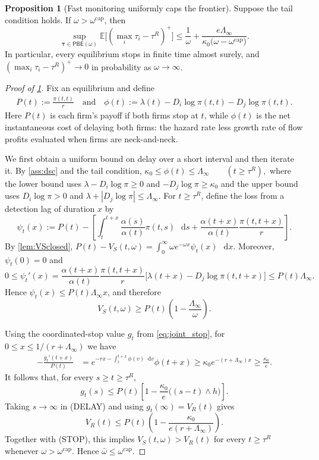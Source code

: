 \documentclass[12pt,reqno]{article}
\newcommand{\de}{\mathop{}\!\mathrm{d}}
\newcommand{\Ex}{\mathbb{E}}
\newcommand{\PBE}{\ensuremath{\mathsf{PBE}}}
\theoremstyle{definition} \newtheorem{example}{Example}
\theoremstyle{definition} \newtheorem{condition}{Condition}
\theoremstyle{definition} \newtheorem{corollary}{Corollary}
\theoremstyle{definition} \newtheorem{claim}{Claim}
\theoremstyle{definition} \newtheorem{definition}{Definition}
\theoremstyle{definition} \newtheorem{conjecture}{Conjecture}
\theoremstyle{definition} \newtheorem{Lemma}{Lemma}
\theoremstyle{definition} \newtheorem{lemma}{Lemma}
\theoremstyle{plain} \newtheorem{theorem}{Theorem}
\theoremstyle{definition} \newtheorem{assumption}{Assumption}
\theoremstyle{definition} \newtheorem*{assumptionnonumber}{Assumption}
\theoremstyle{definition} \newtheorem*{theoremNoNumber}{Proposition}
\theoremstyle{definition}
\theoremstyle{definition}\newtheorem{proposition}{Proposition}
\theoremstyle{definition} \newtheorem{result}{Result}
\theoremstyle{definition} \newtheorem*{definitionNoNumber}{Definition}
\theoremstyle{definition} \newtheorem{Definition}{Definition}
\theoremstyle{definition} \newtheorem*{DefinitionNoNumber}{Definition}
\theoremstyle{definition} \newtheorem*{fact}{Fact}
\theoremstyle{definition} \newtheorem*{property}{Property}
\theoremstyle{definition} \newtheorem{remark}{Remark}
\begin{document}
\begin{proposition}[Fast monitoring uniformly caps the frontier]
\label{prop:cap}
Suppose the tail condition holds. If
$\omega>\omega^{\mathrm{cap}}$, then
\[
\sup_{\bm\tau\in\PBE(\omega)}
\Ex\Big[(\max_i\tau_i-\tau^R)^+\Big]
\leq
\frac1\omega
+
\frac{e\Lambda_\infty}
{\kappa_0\big(\omega-\omega^{\mathrm{cap}}\big)}.
\]
In particular, every equilibrium stops in finite time almost surely, and $(\max_i \tau_i - \tau^R)^+ \to 0$ in probability as $\omega \to \infty$.  
\end{proposition}

\begin{proof}[Proof of \cref{prop:cap}]
Fix an equilibrium and define 
\begin{align*}
P(t):=\frac{\pi(t,t)}r \quad \text{and} \quad 
\phi(t):=\lambda(t)-D_i\log\pi(t,t)-D_j\log\pi(t,t).
\end{align*}
Here $P(t)$ is each firm's payoff if both firms stop at $t$, while $\phi(t)$
is the net instantaneous cost of delaying both firms: the hazard rate less growth rate of flow profits evaluated when firms are neck-and-neck. 

We first obtain a uniform bound on delay over a short interval and then
iterate it. By \cref{ass:dsc} and the tail condition,  $
\kappa_0\leq\phi(t)\leq\Lambda_\infty
\qquad(t\geq\tau^R),$ where the lower bound uses
$\lambda-D_i\log\pi\geq0$ and
$-D_j\log\pi\geq\kappa_0$ and the upper bound uses
$D_i\log\pi>0$ and
$\lambda+|D_j\log\pi|\leq\Lambda_\infty$. 
For $t\geq\tau^R$, define the loss from a detection lag of duration $x$ by
\[
\psi_t(x)
:=
P(t)
-
\left[
\int_t^{t+x}\frac{\alpha(s)}{\alpha(t)}\pi(t,s)\,\de s
+
\frac{\alpha(t+x)}{\alpha(t)}\frac{\pi(t,t+x)}r
\right].
\]
By \cref{lem:VSclosed},
$
P(t)-V_S(t,\omega)
=
\int_0^\infty\omega e^{-\omega x}\psi_t(x)\,\de x.$ Moreover, $\psi_t(0)=0$ and
\[
0\leq\psi_t'(x)
=
\frac{\alpha(t+x)}{\alpha(t)}
\frac{\pi(t,t+x)}r
\big[\lambda(t+x)-D_j\log\pi(t,t+x)\big]
\leq P(t)\Lambda_\infty.
\]
Hence $\psi_t(x)\leq P(t)\Lambda_\infty x$, and therefore
\[
V_S(t,\omega)
\geq
P(t)\left(1-\frac{\Lambda_\infty}{\omega}\right).
\tag{STOP}
\]

 Using the coordinated-stop value $g_t$ from \eqref{eq:joint_stop}, for
$0\leq x\leq1/(r+\Lambda_\infty)$ we have 
\begin{align*}
-\frac{g_t'(t+x)}{P(t)}
&=
e^{-rx-\int_t^{t+x}\phi(v)\de v}\phi(t+x) \geq
\kappa_0 e^{-(r+\Lambda_\infty)x}
\geq 
\frac{\kappa_0}{e}.
\end{align*}
It follows that, for every $s\geq t\geq\tau^R$,
\[
g_t(s)
\leq
P(t)\left[
1-\frac{\kappa_0}{e}\big((s-t)\wedge h\big)
\right].
\tag{DELAY}
\]
Taking $s\to\infty$ in \textup{(DELAY)} and using
$g_t(\infty)=V_R(t)$ gives
\[
V_R(t)
\leq
P(t)\left(1-\frac{\kappa_0}{e(r+\Lambda_\infty)}\right).
\]
Together with \textup{(STOP)}, this implies
$V_S(t,\omega)>V_R(t)$ for every $t\geq\tau^R$ whenever
$\omega>\omega^{\mathrm{cap}}$. Hence
$\bar\omega\leq\omega^{\mathrm{cap}}$.


\end{proof}
\end{document}
